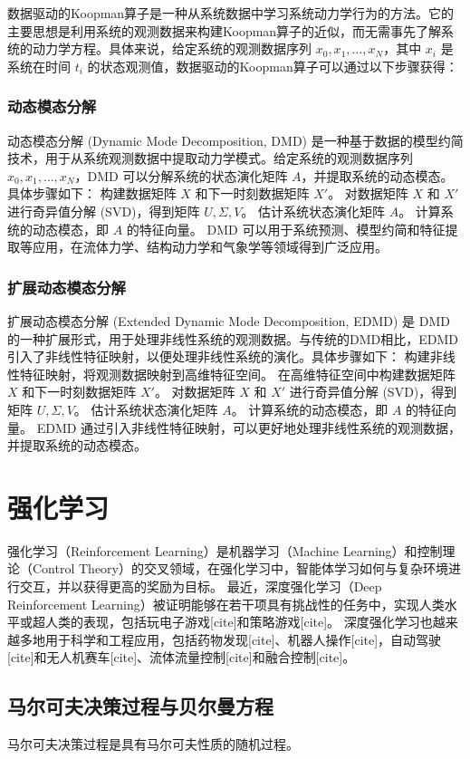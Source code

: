 \documentclass[AutoFakeBold]{LZUThesis}
\begin{document}
数据驱动的Koopman算子是一种从系统数据中学习系统动力学行为的方法。它的主要思想是利用系统的观测数据来构建Koopman算子的近似，而无需事先了解系统的动力学方程。具体来说，给定系统的观测数据序列 ${x_0, x_1, \dots, x_N}$，其中 $x_i$ 是系统在时间 $t_i$ 的状态观测值，数据驱动的Koopman算子可以通过以下步骤获得：

\subsubsection{动态模态分解}
动态模态分解 (Dynamic Mode Decomposition, DMD) 是一种基于数据的模型约简技术，用于从系统观测数据中提取动力学模式。给定系统的观测数据序列 ${x_0, x_1, \dots, x_N}$，DMD 可以分解系统的状态演化矩阵 $A$，并提取系统的动态模态。具体步骤如下：
构建数据矩阵 $X$ 和下一时刻数据矩阵 $X'$。
对数据矩阵 $X$ 和 $X'$ 进行奇异值分解 (SVD)，得到矩阵 $U, \Sigma, V$。
估计系统状态演化矩阵 $A$。
计算系统的动态模态，即 $A$ 的特征向量。
DMD 可以用于系统预测、模型约简和特征提取等应用，在流体力学、结构动力学和气象学等领域得到广泛应用。

\subsubsection{扩展动态模态分解}
扩展动态模态分解 (Extended Dynamic Mode Decomposition, EDMD) 是 DMD 的一种扩展形式，用于处理非线性系统的观测数据。与传统的DMD相比，EDMD引入了非线性特征映射，以便处理非线性系统的演化。具体步骤如下：
构建非线性特征映射，将观测数据映射到高维特征空间。
在高维特征空间中构建数据矩阵 $X$ 和下一时刻数据矩阵 $X'$。
对数据矩阵 $X$ 和 $X'$ 进行奇异值分解 (SVD)，得到矩阵 $U, \Sigma, V$。
估计系统状态演化矩阵 $A$。
计算系统的动态模态，即 $A$ 的特征向量。
EDMD 通过引入非线性特征映射，可以更好地处理非线性系统的观测数据，并提取系统的动态模态。


\section{强化学习}
强化学习（Reinforcement Learning）是机器学习（Machine Learning）和控制理论（Control Theory）的交叉领域，在强化学习中，智能体学习如何与复杂环境进行交互，并以获得更高的奖励为目标。
最近，深度强化学习（Deep Reinforcement Learning）被证明能够在若干项具有挑战性的任务中，实现人类水平或超人类的表现，包括玩电子游戏[cite]和策略游戏[cite]。
深度强化学习也越来越多地用于科学和工程应用，包括药物发现[cite]、机器人操作[cite]，自动驾驶[cite]和无人机赛车[cite]、流体流量控制[cite]和融合控制[cite]。

\subsection{马尔可夫决策过程与贝尔曼方程}
马尔可夫决策过程是具有马尔可夫性质的随机过程。
\end{document}

